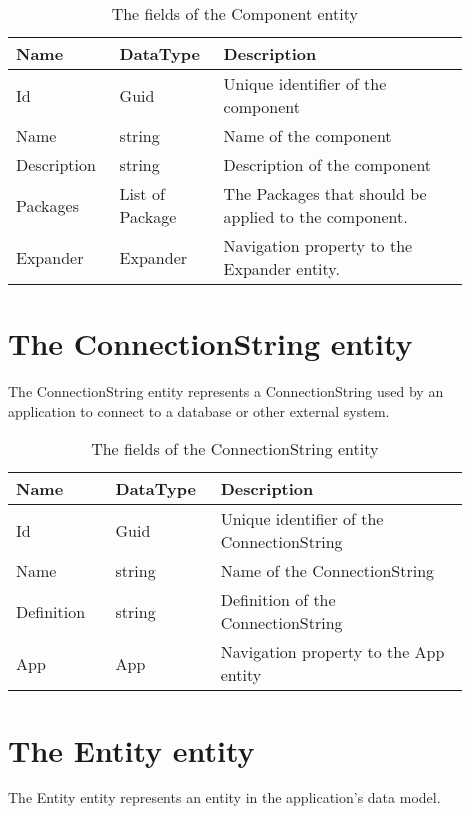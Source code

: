 \begin{table}[H]
\small
\begin{tabular}{ p{0.20\linewidth} p{0.20\linewidth} p{0.50\linewidth} }
\hline
\textbf{Name} & \textbf{DataType} & \textbf{Description} \\
\hline
Id & Guid & Unique identifier of the component \\
Name & string & Name of the component \\
Description & string & Description of the component \\
Packages & List of Package & The Packages that should be applied to the component. \\
Expander & Expander & Navigation property to the Expander entity. \\
\hline
\end{tabular}
\caption{The fields of the Component entity}
\label{table:component_entity}
\end{table}

\section{The ConnectionString entity}

The ConnectionString entity represents a ConnectionString used by an application to
connect to a database or other external system.

\begin{table}[H]
\small
\begin{tabular}{ p{0.20\linewidth} p{0.20\linewidth} p{0.50\linewidth} }
\hline
\textbf{Name} & \textbf{DataType} & \textbf{Description} \\
\hline
Id & Guid & Unique identifier of the ConnectionString \\
Name & string & Name of the ConnectionString \\
Definition & string & Definition of the ConnectionString \\
App & App & Navigation property to the App entity \\
\hline
\end{tabular}
\caption{The fields of the ConnectionString entity}
\label{table:connectionstring_entity}
\end{table}

\section{The Entity entity}

The Entity entity represents an entity in the application's data model. 

